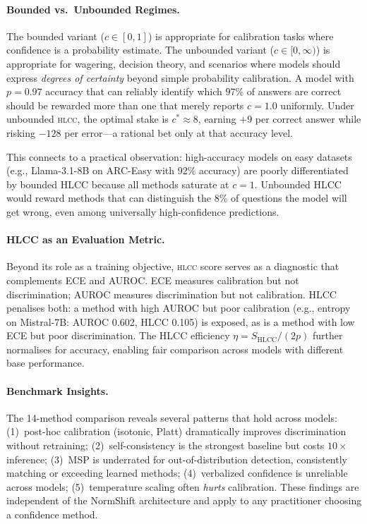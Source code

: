 \documentclass[11pt,a4paper]{article}
\newcommand{\hlcc}{\textsc{hlcc}}
\newcommand{\cstar}{c^{*}}
\begin{document}
\paragraph{Bounded vs.\ Unbounded Regimes.}
The bounded variant ($c \in [0,1]$) is appropriate for calibration
tasks where confidence is a probability estimate.  The unbounded
variant ($c \in [0,\infty)$) is appropriate for wagering, decision
theory, and scenarios where models should express \emph{degrees of
certainty} beyond simple probability calibration.  A model with
$p = 0.97$ accuracy that can reliably identify which 97\% of answers
are correct should be rewarded more than one that merely reports
$c = 1.0$ uniformly.  Under unbounded \hlcc{}, the optimal stake is
$\cstar \approx 8$, earning $+9$ per correct answer while risking
$-128$ per error---a rational bet only at that accuracy level.

This connects to a practical observation: high-accuracy models on
easy datasets (e.g., Llama-3.1-8B on ARC-Easy with 92\% accuracy)
are poorly differentiated by bounded HLCC because all methods
saturate at $c = 1$.  Unbounded HLCC would reward methods that can
distinguish the 8\% of questions the model will get wrong, even among
universally high-confidence predictions.

\paragraph{HLCC as an Evaluation Metric.}
Beyond its role as a training objective, \hlcc{} score serves as a
diagnostic that complements ECE and AUROC.  ECE measures calibration
but not discrimination; AUROC measures discrimination but not
calibration.  HLCC penalises both: a method with high AUROC but poor
calibration (e.g., entropy on Mistral-7B: AUROC 0.602, HLCC 0.105) is
exposed, as is a method with low ECE but poor discrimination.  The
HLCC efficiency $\eta = S_{\text{HLCC}}/(2p)$ further normalises
for accuracy, enabling fair comparison across models with different
base performance.

\paragraph{Benchmark Insights.}
The 14-method comparison reveals several patterns that hold across
models: (1)~post-hoc calibration (isotonic, Platt) dramatically
improves discrimination without retraining; (2)~self-consistency is
the strongest baseline but costs $10\times$ inference;
(3)~MSP is underrated for out-of-distribution detection, consistently
matching or exceeding learned methods; (4)~verbalized confidence is
unreliable across models; (5)~temperature scaling often \emph{hurts}
calibration.  These findings are independent of the NormShift
architecture and apply to any practitioner choosing a confidence
method.
\end{document}
